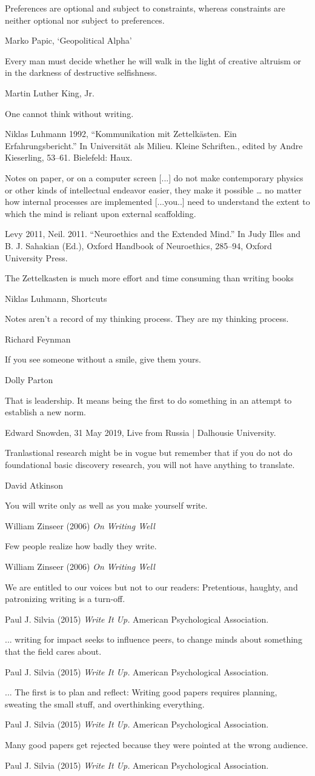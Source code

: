 \epigraph{Preferences are optional and subject to constraints, whereas constraints are neither optional nor subject to preferences.}{Marko Papic, `Geopolitical Alpha'}
\epigraph{Every man must decide whether he will walk in the light of creative altruism or in the darkness of destructive selfishness.}{Martin Luther King, Jr.}
\epigraph{One cannot think without writing.}{Niklas Luhmann 1992, ``Kommunikation mit Zettelkästen. Ein Erfahrungsbericht.'' In Universität als Milieu. Kleine Schriften., edited by Andre Kieserling, 53–61. Bielefeld: Haux.}
\epigraph{Notes on paper, or on a computer screen [...] do not make contemporary physics or other kinds of intellectual endeavor easier, they make it possible … no matter how internal processes are implemented [...you..] need to understand the extent to which the mind is reliant upon external scaffolding.}{Levy 2011, Neil. 2011. ``Neuroethics and the Extended Mind.'' In Judy Illes and B. J. Sahakian (Ed.), Oxford Handbook of Neuroethics, 285–94, Oxford University Press.}
\epigraph{The Zettelkasten is much more effort and time consuming than writing books}{Niklas Luhmann, Shortcuts}
\epigraph{Notes aren’t a record of my thinking process. They are my thinking process.}{Richard Feynman}
\epigraph{If you see someone without a smile, give them yours.}{Dolly Parton}
\epigraph{That is leadership. It means being the first to do something in an attempt to establish a new norm.}{Edward Snowden, 31 May 2019, Live from Russia | Dalhousie University.}
\epigraph{Tranlastional research might be in vogue but remember that if you do not do foundational basic discovery research, you will not have anything to translate.}{David Atkinson}
\epigraph{You will write only as well as you make yourself write.}{William Zinseer (2006) \emph{On Writing Well}}
\epigraph{Few people realize how badly they write.}{William Zinseer (2006) \emph{On Writing Well}}
\epigraph{We are entitled to our voices but not to our readers: Pretentious, haughty, and patronizing writing is a turn-off.}{Paul J. Silvia (2015) \emph{Write It Up.} American Psychological Association.}
\epigraph{... writing for impact seeks to influence peers, to change minds about something that the field cares about.}{Paul J. Silvia (2015) \emph{Write It Up.} American Psychological Association.}
\epigraph{... The first is to plan and reflect: Writing good papers requires planning, sweating the small stuff, and overthinking everything.}{Paul J. Silvia (2015) \emph{Write It Up.} American Psychological Association.}
\epigraph{Many good papers get rejected because they were pointed at the wrong audience.}{Paul J. Silvia (2015) \emph{Write It Up.} American Psychological Association.}
